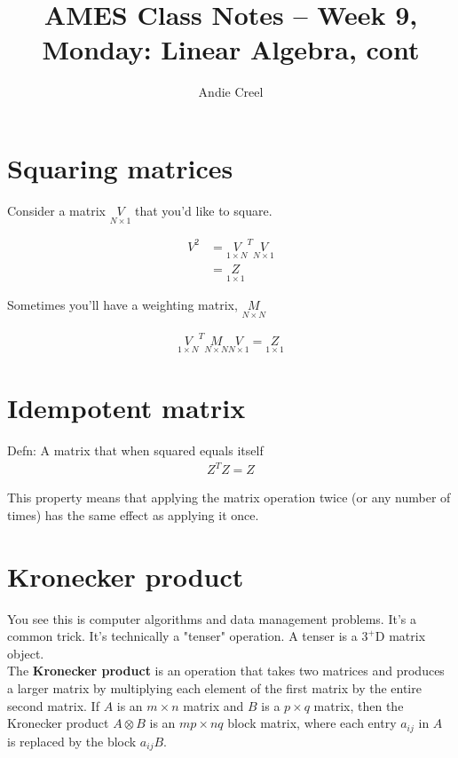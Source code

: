 \documentclass{article}
\title{AMES Class Notes -- Week 9, Monday: Linear Algebra, cont}
\author{Andie Creel}
\begin{document}
\maketitle

\section{Squaring matrices}

Consider a matrix $\underset{N \times 1}{V}$ that you'd like to square. 

\begin{align}
    V^2 &= \underset{1 \times N} V^T  \underset{N \times 1}V\\
    &= \underset{ 1 \times 1} Z
\end{align}

Sometimes you'll have a weighting matrix, $\underset{ N \times N}M$

\begin{align}
   \underset{1 \times N} V^T \underset{ N \times N}M  \underset{N\times 1}V = \underset{ 1 \times 1}  Z   
\end{align}


\section{Idempotent matrix}
Defn: A matrix that when squared equals itself 
\begin{align}
    Z^T Z = Z
\end{align}

This property means that applying the matrix operation twice (or any number of times) has the same effect as applying it once.

\section{Kronecker product}

You see this is computer algorithms and data management problems. It's a common trick. It's technically a "tenser" operation. A tenser is a $3^+$D matrix object. \\

The \textbf{Kronecker product} is an operation that takes two matrices and produces a larger matrix by multiplying each element of the first matrix by the entire second matrix. If \( A \) is an \( m \times n \) matrix and \( B \) is a \( p \times q \) matrix, then the Kronecker product \( A \otimes B \) is an \( mp \times nq \) block matrix, where each entry \( a_{ij} \) in \( A \) is replaced by the block \( a_{ij} B \).
\end{document}

